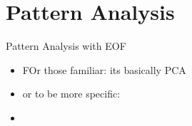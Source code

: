 \section{Pattern Analysis}

\begin{frame}{Pattern Analysis with EOF}
\begin{itemize}
  \item FOr those familiar: its basically PCA
  \item or to be more specific: 
  \item  
  
\end{itemize} 
\end{frame}
